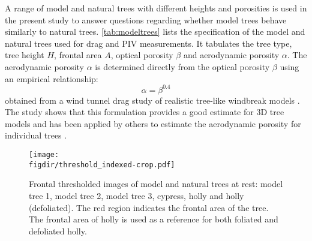 A range of model and natural trees with different heights and porosities is used in the present study to answer questions regarding whether model trees behave similarly to natural trees. \cref{tab:modeltrees} lists the specification of the model and natural trees used for drag and PIV measurements. It tabulates the tree type, tree height $H$, frontal area $A$, optical porosity $\beta$ and aerodynamic porosity $\alpha$. The aerodynamic porosity $\alpha$ is determined directly from the optical porosity $\beta$ using an empirical relationship:
\begin{equation}
\alpha = \beta^{0.4}
\label{eq:aerodynamicporosity}
\end{equation}
obtained from a wind tunnel drag study of realistic tree-like windbreak models \citep{Guan2003}. The study shows that this formulation provides a good estimate for 3D tree models and has been applied by others to estimate the aerodynamic porosity for individual trees \citep{Bitog2011,Lee2014565,Rosenfeld2010}.

	\begin{figure}[t]
	\centering
	\texttt{[image: \\figdir/threshold\_indexed-crop.pdf]}
	\caption{Frontal thresholded images of model and natural trees at rest:  model tree 1,  model tree 2,  model tree 3,  cypress,  holly and  holly (defoliated). The red region indicates the frontal area of the tree. The frontal area of holly is used as a reference for both foliated and defoliated holly.}
	\label{fig:thresholdindexed}
	\end{figure}

